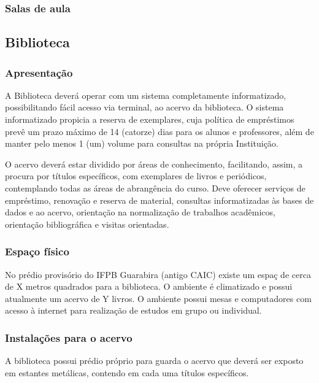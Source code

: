 \subsubsection{Salas de aula}


\subsection{Biblioteca}

\subsubsection{Apresenta\c{c}\~ao}

A Biblioteca deverá operar com um sistema completamente informatizado, possibilitando fácil acesso via terminal, ao acervo da biblioteca. O sistema informatizado propicia a reserva de exemplares, cuja política de empréstimos prevê um prazo máximo de 14 (catorze) dias para os alunos e professores, além de manter pelo menos 1 (um) volume para consultas na própria Instituição.

O acervo deverá estar dividido por áreas de conhecimento, facilitando, assim, a procura por títulos específicos, com exemplares de livros e periódicos, contemplando todas as áreas de abrangência do curso. Deve oferecer serviços de empréstimo, renovação e reserva de material, consultas informatizadas às bases de dados e ao acervo, orientação na normalização de trabalhos acadêmicos, orientação bibliográfica e visitas orientadas.

\subsubsection{Espa\c{c}o f\'isico}

No pr\'edio provis\'orio do IFPB Guarabira (antigo CAIC) existe um espa\c{c} de cerca de X metros quadrados para a biblioteca. O ambiente \'e climatizado e possui atualmente um acervo de Y livros. O ambiente possui mesas e computadores com acesso \`a internet para realiza\c{c}\~ao de estudos em grupo ou individual.

\subsubsection{Instala\c{c}\~oes para o acervo}


A biblioteca possui prédio próprio para guarda o acervo que deverá ser exposto em estantes metálicas, contendo em cada uma títulos específicos. 


